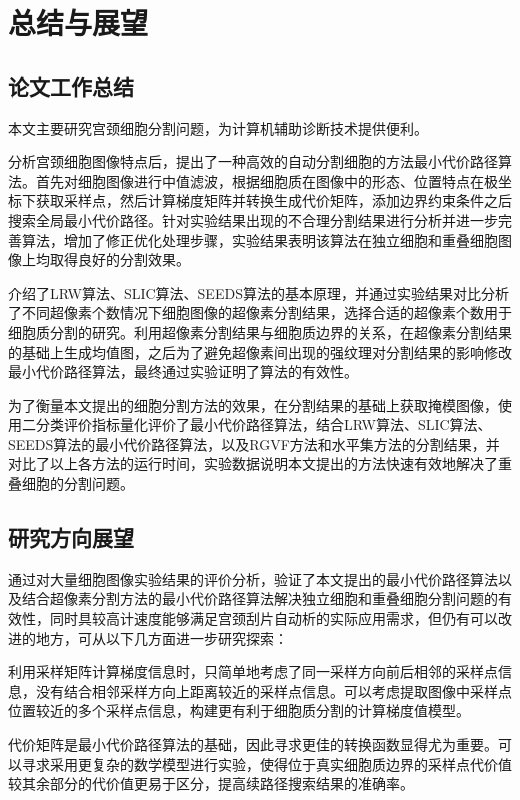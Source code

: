 \documentclass[nomlist,masters]{seuthesix}
\begin{document}
\chapter{总结与展望}
\section{论文工作总结}
本文主要研究宫颈细胞分割问题，为计算机辅助诊断技术提供便利。

分析宫颈细胞图像特点后，提出了一种高效的自动分割细胞的方法最小代价路径算法。首先对细胞图像进行中值滤波，根据细胞质在图像中的形态、位置特点在极坐标下获取采样点，然后计算梯度矩阵并转换生成代价矩阵，添加边界约束条件之后搜索全局最小代价路径。针对实验结果出现的不合理分割结果进行分析并进一步完善算法，增加了修正优化处理步骤，实验结果表明该算法在独立细胞和重叠细胞图像上均取得良好的分割效果。

介绍了LRW算法、SLIC算法、SEEDS算法的基本原理，并通过实验结果对比分析了不同超像素个数情况下细胞图像的超像素分割结果，选择合适的超像素个数用于细胞质分割的研究。利用超像素分割结果与细胞质边界的关系，在超像素分割结果的基础上生成均值图，之后为了避免超像素间出现的强纹理对分割结果的影响修改最小代价路径算法，最终通过实验证明了算法的有效性。

为了衡量本文提出的细胞分割方法的效果，在分割结果的基础上获取掩模图像，使用二分类评价指标量化评价了最小代价路径算法，结合LRW算法、SLIC算法、SEEDS算法的最小代价路径算法，以及RGVF方法和水平集方法的分割结果，并对比了以上各方法的运行时间，实验数据说明本文提出的方法快速有效地解决了重叠细胞的分割问题。



\section{研究方向展望}
通过对大量细胞图像实验结果的评价分析，验证了本文提出的最小代价路径算法以及结合超像素分割方法的最小代价路径算法解决独立细胞和重叠细胞分割问题的有效性，同时具较高计速度能够满足宫颈刮片自动析的实际应用需求，但仍有可以改进的地方，可从以下几方面进一步研究探索：

利用采样矩阵计算梯度信息时，只简单地考虑了同一采样方向前后相邻的采样点信息，没有结合相邻采样方向上距离较近的采样点信息。可以考虑提取图像中采样点位置较近的多个采样点信息，构建更有利于细胞质分割的计算梯度值模型。

代价矩阵是最小代价路径算法的基础，因此寻求更佳的转换函数显得尤为重要。可以寻求采用更复杂的数学模型进行实验，使得位于真实细胞质边界的采样点代价值较其余部分的代价值更易于区分，提高续路径搜索结果的准确率。
\end{document}
